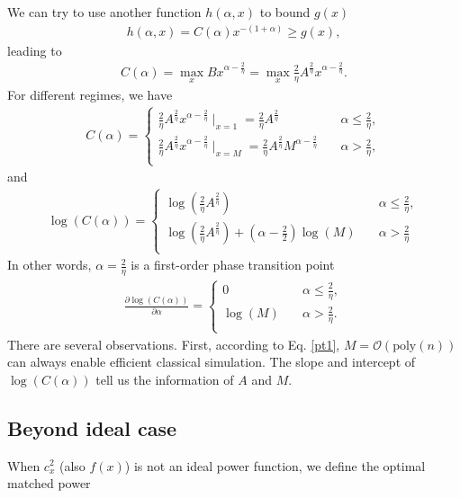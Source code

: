 \documentclass[showpacs,amsmath,amssymb,twocolumn,superscriptaddress,notitlepage,preprintnumbers,aps,pra,10pt,floatfix]{revtex4-2}
\begin{document}
\begin{appendix}
We can try to use another function $h(\alpha, x)$ to bound $g(x)$
\begin{eqnarray}
h(\alpha, x)=C(\alpha)x^{-(1+\alpha)}\geq g(x),
\end{eqnarray}
leading to
\begin{eqnarray}
C(\alpha)=\max_x B x^{\alpha-\frac{2}{\eta}}=\max_x\frac{2}{\eta}A^{\frac{2}{\eta}}x^{\alpha-\frac{2}{\eta}}.
\end{eqnarray}
For different regimes, we have
\begin{eqnarray}\label{pt1}
C(\alpha)= \begin{cases}
\frac{2}{\eta}A^{\frac{2}{\eta}}x^{\alpha-\frac{2}{\eta}}\mid_{x=1}=\frac{2}{\eta}A^{\frac{2}{\eta}} & \quad \alpha\leq \frac{2}{\eta}, \\
\frac{2}{\eta}A^{\frac{2}{\eta}}x^{\alpha-\frac{2}{\eta}}\mid_{x=M}=\frac{2}{\eta}A^{\frac{2}{\eta}}M^{\alpha-\frac{2}{\eta}}& \quad \alpha>\frac{2}{\eta},\\
\end{cases}
\end{eqnarray}
and 
\begin{eqnarray}
\log(C(\alpha))= \begin{cases}
\log(\frac{2}{\eta}A^{\frac{2}{\eta}}) & \quad \alpha\leq \frac{2}{\eta}, \\
\log(\frac{2}{\eta}A^{\frac{2}{\eta}})+(\alpha-\frac{2}{2})\log(M)& \quad \alpha>\frac{2}{\eta}\\
\end{cases}
\end{eqnarray}
In other words, $\alpha=\frac{2}{\eta}$ is a first-order phase transition point
\begin{eqnarray}
\frac{\partial\log(C(\alpha))}{\partial \alpha}= \begin{cases}
0 & \quad \alpha\leq \frac{2}{\eta}, \\
\log(M)& \quad \alpha>\frac{2}{\eta}.\\
\end{cases}
\end{eqnarray}
There are several observations. First, according to Eq. \ref{pt1}, $M=\mathcal{O}(\text{poly}(n))$ can always enable efficient classical simulation. The slope and intercept of $\log(C(\alpha))$ tell us the information of $A$ and $M$.


\subsection{Beyond ideal case}
When $c_x^2$ (also $f(x)$) is not an ideal power function, we define the optimal matched power






\end{appendix}
\end{document}
